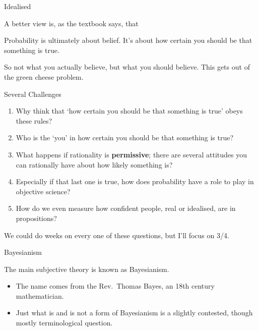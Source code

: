 \documentclass[
  ignorenonframetext,
]{beamer}
\providecommand{\tightlist}{%
  \setlength{\itemsep}{0pt}\setlength{\parskip}{0pt}}
\renewcommand{\,}{\text{, }}
\renewenvironment*{quote}	
	{\list{}{\rightmargin   \leftmargin} \item } 	
	{\endlist }
\begin{document}
\begin{frame}{Idealised}
\protect\hypertarget{idealised}{}

A better view is, as the textbook says, that

\begin{quote}
Probability is ultimately about belief. It's about how certain you
should be that something is true.
\end{quote}

So not what you actually believe, but what you should believe. This gets
out of the green cheese problem.

\end{frame}

\begin{frame}{Several Challenges}
\protect\hypertarget{several-challenges}{}

\begin{enumerate}
\tightlist
\item
  Why think that `how certain you should be that something is true'
  obeys these rules? \pause
\item
  Who is the `you' in how certain you should be that something is true?
  \pause
\item
  What happens if rationality is \textbf{permissive}; there are several
  attitudes you can rationally have about how likely something is?
  \pause
\item
  Especially if that last one is true, how does probability have a role
  to play in objective science? \pause
\item
  How do we even measure how confident people, real or idealised, are in
  propositions? \pause
\end{enumerate}

We could do weeks on every one of these questions, but I'll focus on
3/4.

\end{frame}

\begin{frame}{Bayesianism}
\protect\hypertarget{bayesianism}{}

The main subjective theory is known as Bayesianism.

\begin{itemize}
\tightlist
\item
  The name comes from the Rev.~Thomas Bayes, an 18th century
  mathematician.
\item
  Just what is and is not a form of Bayesianism is a slightly contested,
  though mostly terminological question.
\end{itemize}

\end{frame}
\end{document}
